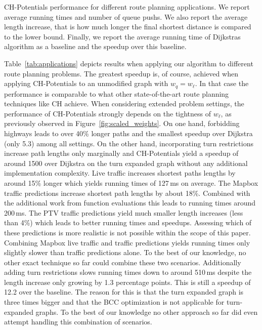 \documentclass[letterpaper]{article} %
\begin{document}
\begin{table}
\centering
\caption{
CH-Potentials performance for different route planning applications.
We report average running times and number of queue pushs.
We also report the average length increase, that is how much longer the final shortest distance is compared to the lower bound.
Finally, we report the average running time of Dijkstras algorithm as a baseline and the speedup over this baseline.
}\label{tab:applications}

\end{table}

Table~\ref{tab:applications} depicts results when applying our algorithm to different route planning problems.
The greatest speedup is, of course, achieved when applying CH-Potentials to an unmodified graph with $w_q = w_\ell$.
In that case the performance is comparable to what other state-of-the-art route planning techniques like CH achieve.
When considering extended problem settings, the performance of CH-Potentials strongly depends on the tightness of $w_\ell$, as previously observed in Figure~\ref{fig:scaled_weights}.
On one hand, forbidding highways leads to over 40\% longer paths and the smallest speedup over Dijkstra (only 5.3) among all settings.
On the other hand, incorporating turn restrictions increase path lengths only marginally and CH-Potentials yield a speedup of around 1500 over Dijkstra on the turn expanded graph without any additional implementation complexity.
Live traffic increases shortest paths lengths by around 15\% longer which yields running times of 127\,ms on average.
The Mapbox traffic predictions increase shortest path lengths by about 18\%.
Combined with the additional work from function evaluations this leads to running times around 200\,ms.
The PTV traffic predictions yield much smaller length increases (less than 4\%) which leads to better running times and speedups.
Assessing which of these predictions is more realistic is not possible within the scope of this paper.
Combining Mapbox live traffic and traffic predictions yields running times only slightly slower than traffic predictions alone.
To the best of our knowledge, no other exact technique so far could combine these two scenarios.
Additionally adding turn restrictions slows running times down to around 510\,ms despite the length increase only growing by 1.3 percentage points.
This is still a speedup of 12.2 over the baseline.
The reason for this is that the turn expanded graph is three times bigger and that the BCC optimization is not applicable for turn-expanded graphs.
To the best of our knowledge no other approach so far did even attempt handling this combination of scenarios.
\end{document}
